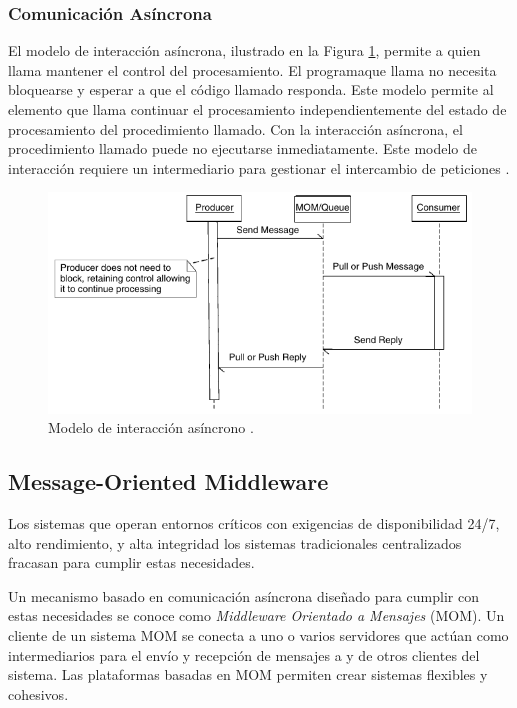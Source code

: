\documentclass[conference,compsoc]{IEEEtran}
\begin{document}
\subsubsection{Comunicación Asíncrona}

El modelo de interacción asíncrona, ilustrado en la Figura \ref{fig:async}, permite a quien llama mantener el control del procesamiento. El programaque llama no necesita bloquearse y esperar a que el código llamado responda. Este modelo permite al elemento que llama continuar el procesamiento independientemente del estado de procesamiento del procedimiento llamado. Con la interacción asíncrona, el procedimiento llamado puede no ejecutarse inmediatamente. Este modelo de interacción requiere un intermediario para gestionar el intercambio de peticiones \cite{curry_2004}.

\begin{figure}[htb]
    \centering
    \includegraphics[width=\columnwidth]{async.png}
    \caption{Modelo de interacción asíncrono \cite[][Figura 1.2]{curry_2004}.}
    \label{fig:async}
\end{figure}

\subsection{Message-Oriented Middleware}

Los sistemas que operan entornos críticos con exigencias de disponibilidad 24/7, alto rendimiento, y alta integridad los sistemas tradicionales centralizados fracasan para cumplir estas necesidades.

Un mecanismo basado en comunicación asíncrona diseñado para cumplir con estas necesidades se conoce como \emph{Middleware Orientado a Mensajes} (MOM).\cite{curry_2004} Un cliente de un sistema MOM se conecta a uno o varios servidores que actúan como intermediarios para el envío y recepción de mensajes a y de otros clientes del sistema. Las plataformas basadas en MOM permiten crear sistemas flexibles y cohesivos.
\end{document}
